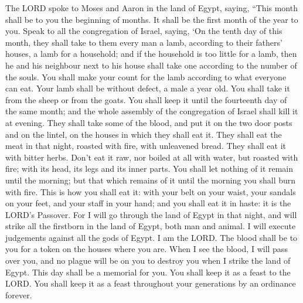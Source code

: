  The LORD spoke to Moses and Aaron in the land of Egypt,
saying,  ``This month shall be to you the beginning of
months. It shall be the first month of the year to you. 
Speak to all the congregation of Israel, saying, `On the tenth day of
this month, they shall take to them every man a lamb, according to their
fathers' houses, a lamb for a household;  and if the
household is too little for a lamb, then he and his neighbour next to
his house shall take one according to the number of the souls. You shall
make your count for the lamb according to what everyone can eat.
 Your lamb shall be without defect, a male a year old. You
shall take it from the sheep or from the goats.  You shall
keep it until the fourteenth day of the same month; and the whole
assembly of the congregation of Israel shall kill it at evening.
 They shall take some of the blood, and put it on the two
door posts and on the lintel, on the houses in which they shall eat it.
 They shall eat the meat in that night, roasted with fire,
with unleavened bread. They shall eat it with bitter herbs. 
Don't eat it raw, nor boiled at all with water, but roasted with fire;
with its head, its legs and its inner parts.  You shall let
nothing of it remain until the morning; but that which remains of it
until the morning you shall burn with fire.  This is how
you shall eat it: with your belt on your waist, your sandals on your
feet, and your staff in your hand; and you shall eat it in haste: it is
the LORD's Passover.  For I will go through the land of
Egypt in that night, and will strike all the firstborn in the land of
Egypt, both man and animal. I will execute judgements against all the
gods of Egypt. I am the LORD.  The blood shall be to you
for a token on the houses where you are. When I see the blood, I will
pass over you, and no plague will be on you to destroy you when I strike
the land of Egypt.  This day shall be a memorial for you.
You shall keep it as a feast to the LORD. You shall keep it as a feast
throughout your generations by an ordinance forever.

